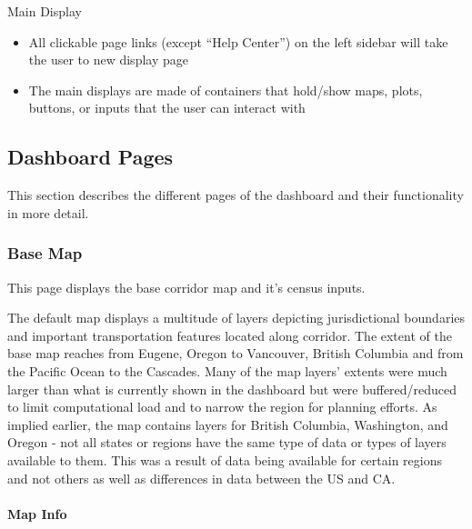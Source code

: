 \documentclass[
]{article}
\providecommand{\tightlist}{%
  \setlength{\itemsep}{0pt}\setlength{\parskip}{0pt}}
\begin{document}
Main Display

\begin{itemize}
\tightlist
\item
  All clickable page links (except ``Help Center'') on the left sidebar
  will take the user to new display page
\item
  The main displays are made of containers that hold/show maps, plots,
  buttons, or inputs that the user can interact with
\end{itemize}

\hypertarget{dashboard-pages}{%
\subsection{Dashboard Pages}\label{dashboard-pages}}

This section describes the different pages of the dashboard and their
functionality in more detail.

\hypertarget{base-map}{%
\subsubsection{Base Map}\label{base-map}}

This page displays the base corridor map and it's census inputs.

The default map displays a multitude of layers depicting jurisdictional
boundaries and important transportation features located along corridor.
The extent of the base map reaches from Eugene, Oregon to Vancouver,
British Columbia and from the Pacific Ocean to the Cascades. Many of the
map layers' extents were much larger than what is currently shown in the
dashboard but were buffered/reduced to limit computational load and to
narrow the region for planning efforts. As implied earlier, the map
contains layers for British Columbia, Washington, and Oregon - not all
states or regions have the same type of data or types of layers
available to them. This was a result of data being available for certain
regions and not others as well as differences in data between the US and
CA.

\hypertarget{map-info}{%
\paragraph{Map Info}\label{map-info}}
\end{document}
